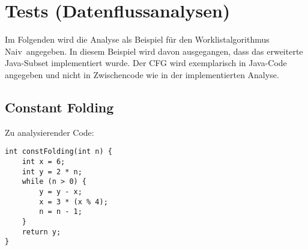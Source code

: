\section{Tests (Datenflussanalysen)}

Im Folgenden wird die Analyse als Beispiel für den Worklistalgorithmus \glqq Naiv\grqq\ angegeben.
In diesem Beispiel wird davon ausgegangen, dass das erweiterte Java-Subset implementiert wurde.
Der CFG wird exemplarisch in Java-Code angegeben und nicht in Zwischencode wie in der implementierten Analyse.


\subsection{Constant Folding}

Zu analysierender Code: \par

\begin{lstlisting}[frame=single]
int constFolding(int n) {
	int x = 6;
	int y = 2 * n;
	while (n > 0) {
		y = y - x;
		x = 3 * (x % 4);
		n = n - 1;
	}
	return y;
}
\end{lstlisting}

\par

